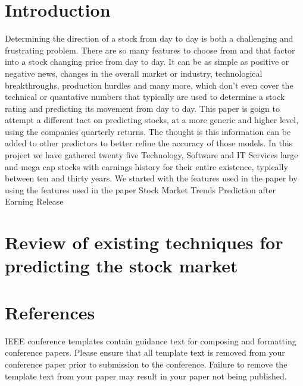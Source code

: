 \documentclass[conference]{IEEEtran}
\begin{document}
\section{Introduction}
Determining the direction of a stock from day to day is both a challenging and frustrating problem.  There are so many features to choose from and that factor into a stock changing price from day to day. It can be as simple as positive or negative news, changes in the overall market or industry, technological breakthroughs, production hurdles and many more, which don't even cover the technical or quantative numbers that typically are used to determine a stock rating and predicting its movement from day to day.  This paper is goign to attempt a different tact on predicting stocks, at a more generic and higher level, using the companies quarterly returns.  The thought is this information can be added to other predictors to better refine the accuracy of those models.  In this project we have gathered twenty five Technology, Software and IT Services large and mega cap stocks with earnings history for their entire existence, typically between ten and thirty years.  We started with the features used in the paper by using the features used in the paper Stock Market Trends Prediction after Earning Release  \cite{QuarterlyPrediction}

\section{Review of existing techniques for predicting the stock market}




\section*{References}





\vspace{12pt}
\color{red}
IEEE conference templates contain guidance text for composing and formatting conference papers. Please ensure that all template text is removed from your conference paper prior to submission to the conference. Failure to remove the template text from your paper may result in your paper not being published.
\end{document}
